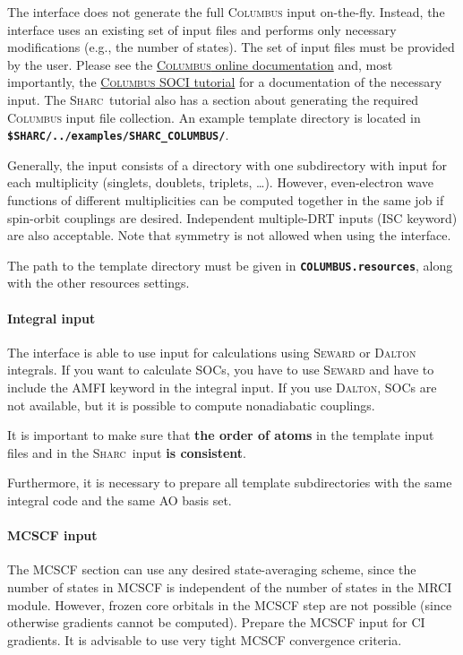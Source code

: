 \documentclass[a4paper,10pt,DIV=15,openany]{scrbook}
\newcommand{\link}[2]{\href{#1}{#2}}
\newcommand{\sharc}{\textsc{Sharc}}
\newcommand{\ttt}[1]{\textbf{\texttt{#1}}}
\begin{document}
The interface does not generate the full \textsc{Columbus} input on-the-fly. Instead, the interface uses an existing set of input files and performs only necessary modifications (e.g., the number of states). The set of input files must be provided by the user. Please see the \link{http://www.univie.ac.at/columbus/docs_COL70/documentation_main.html}{\textsc{Columbus} online documentation} and, most importantly, the 
\link{http://www.univie.ac.at/columbus/docs_COL70/tutorial-SO.pdf}{\textsc{Columbus} SOCI tutorial} for a documentation of the necessary input.
The \sharc\ tutorial also has a section about generating the required \textsc{Columbus} input file collection.
An example template directory is located in \ttt{\$SHARC/../examples/SHARC\_COLUMBUS/}.

Generally, the input consists of a directory with one subdirectory with input for each multiplicity (singlets, doublets, triplets, \dots). However, even-electron wave functions of different multiplicities can be computed together in the same job if spin-orbit couplings are desired. Independent multiple-DRT inputs (ISC keyword) are also acceptable. Note that symmetry is not allowed when using the interface.

The path to the template directory must be given in \ttt{COLUMBUS.resources}, along with the other resources settings.

\paragraph{Integral input}

The interface is able to use input for calculations using \textsc{Seward} or \textsc{Dalton} integrals. 
If you want to calculate SOCs, you have to use \textsc{Seward} and have to include the AMFI keyword in the integral input.
If you use \textsc{Dalton}, SOCs are not available, but it is possible to compute nonadiabatic couplings.

It is important to make sure that \textbf{the order of atoms} in the template input files and in the \sharc\ input \textbf{is consistent}.

Furthermore, it is necessary to prepare all template subdirectories with the same integral code and the same AO basis set. 

\paragraph{MCSCF input}

The MCSCF section can use any desired state-averaging scheme, since the number of states in MCSCF is independent of the number of states in the MRCI module. However, frozen core orbitals in the MCSCF step are not possible (since otherwise gradients cannot be computed). Prepare the MCSCF input for CI gradients. It is advisable to use very tight MCSCF convergence criteria.
\end{document}
